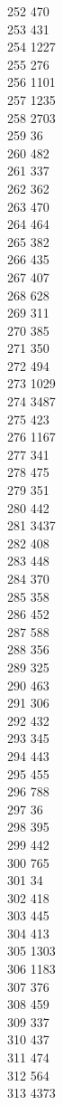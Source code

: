 { 252	470 \\
 253	431 \\
 254	1227 \\
 255	276 \\
 256	1101 \\
 257	1235 \\
 258	2703 \\
 259	36 \\
 260	482 \\
 261	337 \\
 262	362 \\
 263	470 \\
 264	464 \\
 265	382 \\
 266	435 \\
 267	407 \\
 268	628 \\
 269	311 \\
 270	385 \\
 271	350 \\
 272	494 \\
 273	1029 \\
 274	3487 \\
 275	423 \\
 276	1167 \\
 277	341 \\
 278	475 \\
 279	351 \\
 280	442 \\
 281	3437 \\
 282	408 \\
 283	448 \\
 284	370 \\
 285	358 \\
 286	452 \\
 287	588 \\
 288	356 \\
 289	325 \\
 290	463 \\
 291	306 \\
 292	432 \\
 293	345 \\
 294	443 \\
 295	455 \\
 296	788 \\
 297	36 \\
 298	395 \\
 299	442 \\
 300	765 \\
 301	34 \\
 302	418 \\
 303	445 \\
 304	413 \\
 305	1303 \\
 306	1183 \\
 307	376 \\
 308	459 \\
 309	337 \\
 310	437 \\
 311	474 \\
 312	564 \\
 313	4373 \\
}
